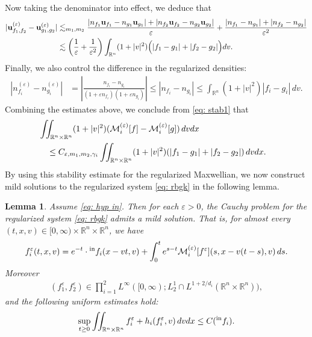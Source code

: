 \documentclass[10pt,reqno]{amsart}
\numberwithin{equation}{section}
\newtheorem{lemma}{Lemma}[section]
\newcommand{\R}{\mathbb R}
\newcommand{\calM}{\mathcal M}
\newcommand{\ve}{\varepsilon}
\begin{document}
Now taking the denominator into effect, we deduce that
\begin{equation*}%
\begin{split}
    |{\bf{u}}_{f_1,f_2}^{(\ve)} - {\bf{u}}_{g_1,g_2}^{(\ve)}| &\lesssim_{m_1,m_2} \frac{|n_{f_1}{\bf{u}}_{f_1} - n_{g_1}{\bf{u}}_{g_1}| + |n_{f_2}{\bf{u}}_{f_2} - n_{g_2}{\bf{u}}_{g_2}|}{\ve} + \frac{|n_{f_1}-n_{g_1}| + |n_{f_2}-n_{g_2}|}{\ve^2}\\
    &\lesssim \left(\frac{1}{\ve}+\frac{1}{\ve^2}\right) \int_{\R^n} (1+|v|^2)\Big(|f_1 - g_1| + |f_2 - g_2| \Big) dv.
\end{split}
\end{equation*}
Finally, we also control the difference in the regularized densities:
\begin{align*}
    |n_{f_i}^{(\ve)} - n_{g_i}^{(\ve)}| &= \left|\frac{n_{f_i} - n_{g_i}}{(1+\ve n_{f_i})(1+\ve n_{g_i})} \right| \le |n_{f_i} - n_{g_i}| \le \int_{\R^n} (1+|v|^2) |f_i-g_i| \,dv.
\end{align*}
Combining the estimates above, we conclude from \eqref{eq: stab1} that
\begin{equation}\label{eq: stabimp}
\begin{split}
 &\iint_{\R^n \times \R^n} (1+|v|^2)(\calM^{(\ve)}_i[f] - \calM^{(\ve)}_i[g]) \,dvdx  \cr
 &\quad \le C_{\ve,m_1,m_2,\gamma_i} \iint_{\R^n \times \R^n} (1+|v|^2) (|f_1 - g_1| + |f_2 - g_2|) \, dvdx.
    \end{split}
\end{equation}
By using this stability estimate for the regularized Maxwellian, we now construct mild solutions to the regularized system \eqref{eq: rbgk} in the following lemma.
\begin{lemma} \label{lem: regbgk}
    Assume \eqref{eq: hyp in}. Then for each $\ve>0$, the Cauchy problem for the regularized system \eqref{eq: rbgk} admits a mild solution. That is, for almost every $(t,x,v)\in [0,\infty)\times\R^n \times \R^n$, we have
    \begin{align}\label{eq: reg mild}
        f_i^\ve(t,x,v) = e^{-t}\cdot {}^{\rm in}f_i(x-vt,v) + \int_0^t e^{s-t}\calM_i^{(\ve)}[f^\ve](s,x-v(t-s),v)\,ds.
    \end{align}
    Moreover
    \begin{align*}
        (f_1^\ve,f_2^\ve) \in \prod_{i=1}^2 L^\infty([0,\infty);L^1_2 \cap L^{1+2/d_i} (\R^n \times \R^n)),
    \end{align*}
    and the following uniform estimates hold:
    \begin{align*}
        \sup_{t\ge 0}\iint_{\R^n \times \R^n} f_i^\ve + h_i(f_i^\ve,v) \, dvdx \le C({}^{\rm in}f_i).
    \end{align*}
\end{lemma}
\end{document}
